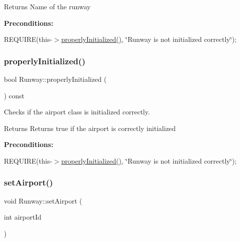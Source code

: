 \begin{DoxyReturn}{Returns}
Name of the runway
\end{DoxyReturn}
{\bfseries Preconditions\+:}
\begin{DoxyItemize}
\item R\+E\+Q\+U\+I\+RE(this-\/$>$\mbox{\hyperlink{class_runway_a360d98246cabf3aa929765f81a656348}{properly\+Initialized()}}, \char`\"{}\+Runway is not initialized correctly\char`\"{}); 
\end{DoxyItemize}\mbox{\label{class_runway_a360d98246cabf3aa929765f81a656348}} 
\subsubsection{\texorpdfstring{properly\+Initialized()}{properlyInitialized()}}
{\footnotesize\ttfamily bool Runway\+::properly\+Initialized (\begin{DoxyParamCaption}{ }\end{DoxyParamCaption}) const}



Checks if the airport class is initialized correctly. 

\begin{DoxyReturn}{Returns}
Returns true if the airport is correctly initialized
\end{DoxyReturn}
{\bfseries Preconditions\+:}
\begin{DoxyItemize}
\item R\+E\+Q\+U\+I\+RE(this-\/$>$\mbox{\hyperlink{class_runway_a360d98246cabf3aa929765f81a656348}{properly\+Initialized()}}, \char`\"{}\+Runway is not initialized correctly\char`\"{}); 
\end{DoxyItemize}\mbox{\label{class_runway_a6614626321a1f4c33f24800cbe78d330}} 
\subsubsection{\texorpdfstring{set\+Airport()}{setAirport()}}
{\footnotesize\ttfamily void Runway\+::set\+Airport (\begin{DoxyParamCaption}\item[{int}]{airport\+Id }\end{DoxyParamCaption})}



